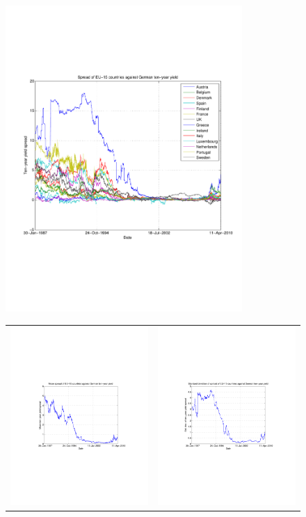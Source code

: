 \documentclass[3p]{elsarticle}
\begin{document}
\begin{figure}[ht!]
	\centering
	\includegraphics[width=9cm]{fig_de_spread_eu15}
	\begin{tabular}{cc}
		\includegraphics[width=7cm]{fig_de_meanspread_eu15} & \includegraphics[width=7cm]{fig_de_stdspread_eu15}\\

\end{tabular}
\end{figure}
\end{document}
